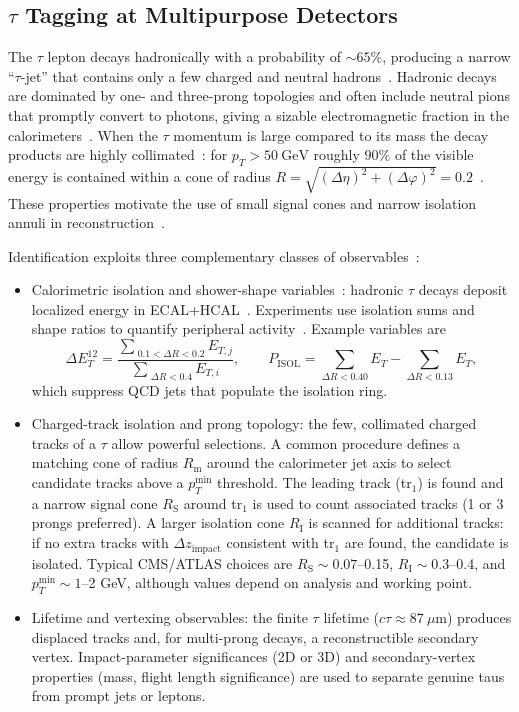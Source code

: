\subsection{$\tau$ Tagging at Multipurpose Detectors}

The $\tau$ lepton decays hadronically with a probability of $\sim65\%$, producing a narrow ``$\tau$-jet'' that contains only a few charged and neutral hadrons~\cite{dummy}. Hadronic decays are dominated by one- and three-prong topologies and often include neutral pions that promptly convert to photons, giving a sizable electromagnetic fraction in the calorimeters~\cite{dummy}. When the $\tau$ momentum is large compared to its mass the decay products are highly collimated~\cite{dummy}: for $p_T>50\ \mathrm{GeV}$ roughly $90\%$ of the visible energy is contained within a cone of radius $R=\sqrt{(\Delta\eta)^2+(\Delta\varphi)^2}=0.2$~\cite{dummy}. These properties motivate the use of small signal cones and narrow isolation annuli in reconstruction~\cite{dummy}.

Identification exploits three complementary classes of observables~\cite{dummy}:

\begin{itemize}
  \item Calorimetric isolation and shower-shape variables~\cite{dummy}: hadronic $\tau$ decays deposit localized energy in ECAL+HCAL~\cite{dummy}. Experiments use isolation sums and shape ratios to quantify peripheral activity~\cite{dummy}. Example variables are~\cite{dummy}
  \[
    \Delta E_T^{12}=\frac{\sum_{\;0.1<\Delta R<0.2} E_{T,j}}{\sum_{\;\Delta R<0.4} E_{T,i}},\qquad
    P_{\mathrm{ISOL}}=\sum_{\Delta R<0.40}E_T - \sum_{\Delta R<0.13}E_T,
  \]
  which suppress QCD jets that populate the isolation ring.
  \item Charged-track isolation and prong topology: the few, collimated charged tracks of a $\tau$ allow powerful selections. A common procedure defines a matching cone of radius $R_{\mathrm{m}}$ around the calorimeter jet axis to select candidate tracks above a $p_T^{\min}$ threshold. The leading track (tr$_1$) is found and a narrow signal cone $R_{\mathrm{S}}$ around tr$_1$ is used to count associated tracks (1 or 3 prongs preferred). A larger isolation cone $R_{\mathrm{I}}$ is scanned for additional tracks: if no extra tracks with $\Delta z_{\text{impact}}$ consistent with tr$_1$ are found, the candidate is isolated. Typical CMS/ATLAS choices are $R_{\mathrm{S}}\sim0.07$–0.15, $R_{\mathrm{I}}\sim0.3$–0.4, and $p_T^{\min}\sim1$–2 GeV, although values depend on analysis and working point.
  \item Lifetime and vertexing observables: the finite $\tau$ lifetime ($c\tau\approx87\ \mu\mathrm{m}$) produces displaced tracks and, for multi-prong decays, a reconstructible secondary vertex. Impact-parameter significances (2D or 3D) and secondary-vertex properties (mass, flight length significance) are used to separate genuine taus from prompt jets or leptons.
\end{itemize}

